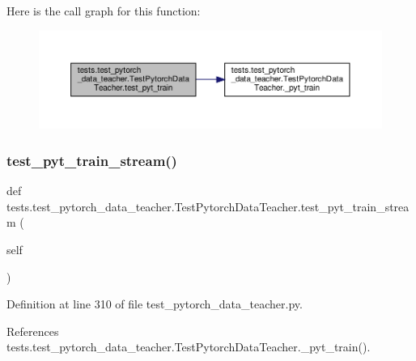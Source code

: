 Here is the call graph for this function\+:
\nopagebreak
\begin{figure}[H]
\begin{center}
\leavevmode
\includegraphics[width=350pt]{classtests_1_1test__pytorch__data__teacher_1_1TestPytorchDataTeacher_a4321d4b1619bf66a94146e811d869185_cgraph}
\end{center}
\end{figure}
\mbox{\label{classtests_1_1test__pytorch__data__teacher_1_1TestPytorchDataTeacher_a3d14342d0d8a931821b223111e383d8e}} 
\subsubsection{\texorpdfstring{test\+\_\+pyt\+\_\+train\+\_\+stream()}{test\_pyt\_train\_stream()}}
{\footnotesize\ttfamily def tests.\+test\+\_\+pytorch\+\_\+data\+\_\+teacher.\+Test\+Pytorch\+Data\+Teacher.\+test\+\_\+pyt\+\_\+train\+\_\+stream (\begin{DoxyParamCaption}\item[{}]{self }\end{DoxyParamCaption})}



Definition at line 310 of file test\+\_\+pytorch\+\_\+data\+\_\+teacher.\+py.



References tests.\+test\+\_\+pytorch\+\_\+data\+\_\+teacher.\+Test\+Pytorch\+Data\+Teacher.\+\_\+pyt\+\_\+train().

